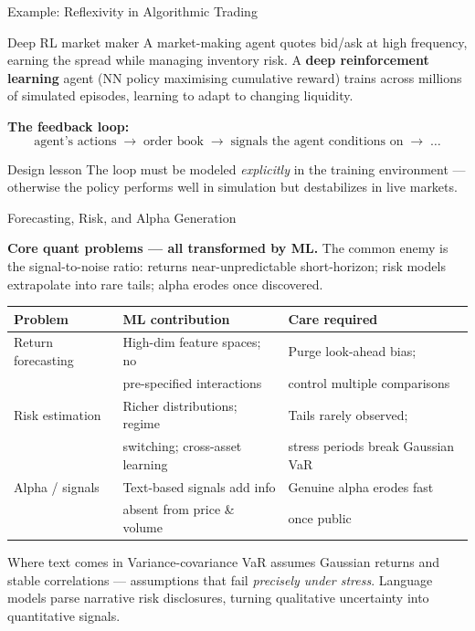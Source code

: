 \documentclass[9pt,t]{beamer}
\begin{document}
\begin{frame}{Example: Reflexivity in Algorithmic Trading}

\begin{exampleblock}{Deep RL market maker}
A market-making agent quotes bid/ask at high frequency, earning the spread while
managing inventory risk. A \textbf{deep reinforcement learning} agent (NN policy
maximising cumulative reward) trains across millions of simulated episodes,
learning to adapt to changing liquidity.
\end{exampleblock}

\medskip
\textbf{The feedback loop:}
\[
  \text{agent's actions} \;\longrightarrow\; \text{order book}
  \;\longrightarrow\; \text{signals the agent conditions on} \;\longrightarrow\; \dots
\]

\medskip
\begin{block}{Design lesson}
The loop must be modeled \emph{explicitly} in the training environment ---
otherwise the policy performs well in simulation but \alert{destabilizes in live markets}.
\end{block}
\end{frame}

\begin{frame}{Forecasting, Risk, and Alpha Generation}

\textbf{Core quant problems --- all transformed by ML.} The common enemy is the
\alert{signal-to-noise ratio}: returns near-unpredictable short-horizon; risk
models extrapolate into rare tails; alpha erodes once discovered.

\medskip
\begin{tabular}{lll}
\toprule
\textbf{Problem} & \textbf{ML contribution} & \textbf{Care required} \\
\midrule
Return forecasting & High-dim feature spaces; no & Purge look-ahead bias; \\
                   & pre-specified interactions     & control multiple comparisons \\[3pt]
Risk estimation    & Richer distributions; regime  & Tails rarely observed; \\
                   & switching; cross-asset learning & stress periods break Gaussian VaR \\[3pt]
Alpha / signals    & Text-based signals add info    & Genuine alpha erodes fast \\
                   & absent from price \& volume    & once public \\
\bottomrule
\end{tabular}

\medskip
\begin{block}{Where text comes in}
Variance-covariance VaR assumes Gaussian returns and stable correlations ---
assumptions that fail \emph{precisely under stress}. Language models parse
narrative risk disclosures, turning qualitative uncertainty into quantitative signals.
\end{block}
\end{frame}
\end{document}
